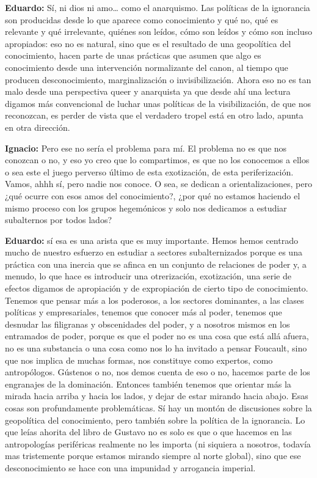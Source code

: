 \documentclass[
]{interact}
\begin{document}
\textbf{Eduardo:} Sí, ni dios ni amo\ldots{} como el anarquismo. Las
políticas de la ignorancia son producidas desde lo que aparece como
conocimiento y qué no, qué es relevante y qué irrelevante, quiénes son
leídos, cómo son leídos y cómo son incluso apropiados: eso no es
natural, sino que es el resultado de una geopolítica del conocimiento,
hacen parte de unas prácticas que asumen que algo es conocimiento desde
una intervención normalizante del canon, al tiempo que producen
desconocimiento, marginalización o invisibilización. Ahora eso no es tan
malo desde una perspectiva queer y anarquista ya que desde ahí una
lectura digamos más convencional de luchar unas políticas de la
visibilización, de que nos reconozcan, es perder de vista que el
verdadero tropel está en otro lado, apunta en otra dirección.

\textbf{Ignacio:} Pero ese no sería el problema para mí. El problema no
es que nos conozcan o no, y eso yo creo que lo compartimos, es que no
los conocemos a ellos o sea este el juego perverso último de esta
exotización, de esta periferización. Vamos, ahhh sí, pero nadie nos
conoce. O sea, se dedican a orientalizaciones, pero ¿qué ocurre con esos
amos del conocimiento?, ¿por qué no estamos haciendo el mismo proceso
con los grupos hegemónicos y solo nos dedicamos a estudiar subalternos
por todos lados?

\textbf{Eduardo:} sí esa es una arista que es muy importante. Hemos
hemos centrado mucho de nuestro esfuerzo en estudiar a sectores
subalternizados porque es una práctica con una inercia que se afinca en
un conjunto de relaciones de poder y, a menudo, lo que hace es
introducir una otrerización, exotización, una serie de efectos digamos
de apropiación y de expropiación de cierto tipo de conocimiento. Tenemos
que pensar más a los poderosos, a los sectores dominantes, a las clases
políticas y empresariales, tenemos que conocer más al poder, tenemos que
desnudar las filigranas y obscenidades del poder, y a nosotros mismos en
los entramados de poder, porque es que el poder no es una cosa que está
allá afuera, no es una substancia o una cosa como nos lo ha invitado a
pensar Foucault, sino que nos implica de muchas formas, nos constituye
como expertos, como antropólogos. Gústenos o no, nos demos cuenta de eso
o no, hacemos parte de los engranajes de la dominación. Entonces también
tenemos que orientar más la mirada hacia arriba y hacia los lados, y
dejar de estar mirando hacia abajo. Esas cosas son profundamente
problemáticas. Sí hay un montón de discusiones sobre la geopolítica del
conocimiento, pero también sobre la política de la ignorancia. Lo que
leías ahorita del libro de Gustavo no es solo es que o que hacemos en
las antropologías periféricas realmente no les importa (ni siquiera a
nosotros, todavía mas tristemente porque estamos mirando siempre al
norte global), sino que ese desconocimiento se hace con una impunidad y
arrogancia imperial.
\end{document}

